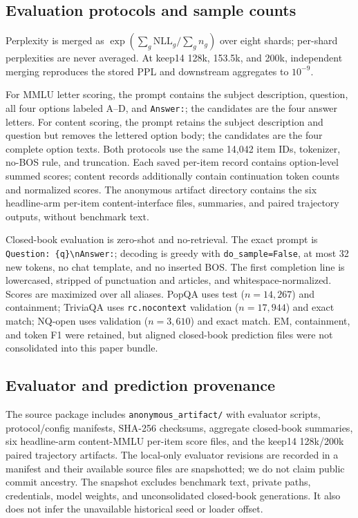 \subsection{Evaluation protocols and sample counts}


Perplexity is merged as
$\exp(\sum_g\mathrm{NLL}_g/\sum_g n_g)$ over eight shards; per-shard
perplexities are never averaged. At keep14 128k, 153.5k, and 200k, independent
merging reproduces the stored PPL and downstream aggregates to $10^{-9}$.

For MMLU letter scoring, the prompt contains the subject description, question,
all four options labeled A--D, and \texttt{Answer:}; the candidates are the
four answer letters. For content scoring, the prompt retains the subject
description and question but removes the lettered option body; the candidates
are the four complete option texts. Both protocols use the same 14,042 item IDs,
tokenizer, no-BOS rule, and truncation. Each saved per-item record contains
option-level summed scores; content records additionally contain continuation
token counts and normalized scores. The anonymous artifact directory contains
the six headline-arm per-item content-interface files, summaries, and paired
trajectory outputs, without benchmark text.

Closed-book evaluation is zero-shot and no-retrieval. The exact prompt is
\texttt{Question: \{q\}\textbackslash nAnswer:}; decoding is greedy with
\texttt{do\_sample=False}, at most 32 new tokens, no chat template, and no
inserted BOS. The first completion line is lowercased, stripped of punctuation
and articles, and whitespace-normalized. Scores are maximized over all aliases.
PopQA uses test ($n{=}14{,}267$) and containment; TriviaQA uses
\texttt{rc.nocontext} validation ($n{=}17{,}944$) and exact match; NQ-open uses
validation ($n{=}3{,}610$) and exact match. EM, containment, and token F1 were
retained, but aligned closed-book prediction files were not consolidated into
this paper bundle.

\subsection{Evaluator and prediction provenance}
The source package includes \texttt{anonymous\_artifact/} with evaluator
scripts, protocol/config manifests, SHA-256 checksums, aggregate closed-book
summaries, six headline-arm content-MMLU per-item score files, and the keep14
128k/200k paired trajectory artifacts. The local-only evaluator revisions are
recorded in a manifest and their available source files are snapshotted; we do
not claim public commit ancestry. The snapshot excludes benchmark text, private
paths, credentials, model weights, and unconsolidated closed-book generations.
It also does not infer the unavailable historical seed or loader offset.

